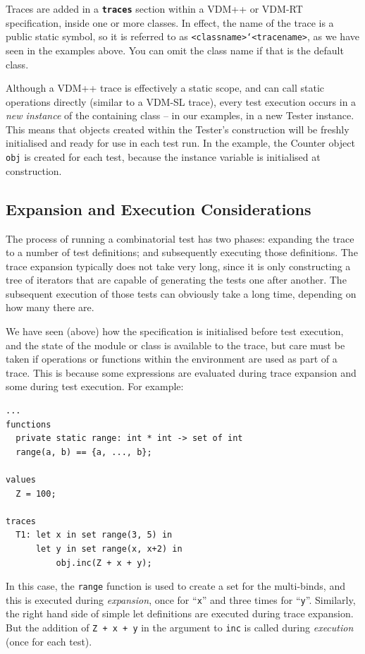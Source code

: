 \documentclass{overturerepchap}
\begin{document}
Traces are added in a \texttt{\textbf{traces}} section within a VDM++ or VDM-RT
specification, inside one or more classes. In effect, the name of the trace is
a public static symbol, so it is referred to as
\texttt{<classname>`<tracename>}, as we have seen in the examples above. You
can omit the class name if that is the default class.

Although a VDM++ trace is effectively a static scope, and can call static
operations directly (similar to a VDM-SL trace), every test execution occurs in
a \emph{new instance} of the containing class -- in our examples, in a new Tester
instance. This means that objects created within the Tester's construction will
be freshly initialised and ready for use in each test run. In the example, the
Counter object \texttt{obj} is created for each test, because the instance
variable is initialised at construction.

\subsection{Expansion and Execution Considerations}

The process of running a combinatorial test has two phases: expanding the trace
to a number of test definitions; and subsequently executing those definitions.
The trace expansion typically does not take very long, since it is only
constructing a tree of iterators that are capable of generating the tests one
after another. The subsequent execution of those tests can obviously take a long
time, depending on how many there are.

We have seen (above) how the specification is initialised before test execution,
and the state of the module or class is available to the trace, but care must be
taken if operations or functions within the environment are used as part of a
trace. This is because some expressions are evaluated during trace expansion and
some during test execution. For example:

\small
\begin{lstlisting}
...
functions
  private static range: int * int -> set of int
  range(a, b) == {a, ..., b};

values
  Z = 100;

traces
  T1: let x in set range(3, 5) in
      let y in set range(x, x+2) in
          obj.inc(Z + x + y);
\end{lstlisting}
\normalsize

\noindent In this case, the \texttt{range} function is used to create a set for the
multi-binds, and this is executed during \emph{expansion}, once for ``\texttt{x}'' and three
times for ``\texttt{y}''. Similarly, the right hand side of simple let definitions are
executed during trace expansion. But the addition of \texttt{Z + x + y} in the
argument to \texttt{inc} is called during \emph{execution} (once for each test).
\end{document}
